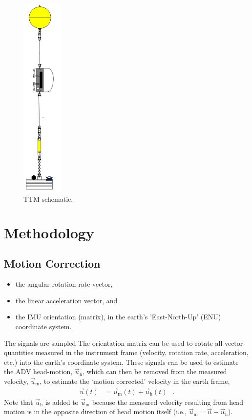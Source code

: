 \documentclass[twocol]{ametsoc}
\def\earth{}
\def\ue{\ensuremath{\vec{u}\earth}}
\def\uacc{\ensuremath{\ue_a}}
\begin{document}
\begin{figure}[t]
  \centering
  \includegraphics[width=0.8in]{ttm06}
  \caption{TTM schematic.}
  \label{fig:ttm_schematic}
\end{figure}

\section{Methodology}

\subsection{Motion Correction}\label{sec:proc:motion}

\def\AngRt{\ensuremath{\vec{\omega}}}
\def\Accel{\ensuremath{{\vec{a}^*}}}
\def\Accelp{\ensuremath{{\vec{a}^{*'}}}}
\def\ue{\ensuremath{\vec{u}\earth}}
\def\um{\ensuremath{\ue_\mathrm{h}}}
\def\uadv{\ensuremath{\ue_\mathrm{m}}}
\def\urot{\ensuremath{\ue_\omega}}
\def\uacc{\ensuremath{\ue_a}}

\begin{itemize}
\item the angular rotation rate vector,
\item the linear acceleration vector, and
\item the IMU orientation (matrix), in the earth's 'East-North-Up' (ENU) coordinate system.
\end{itemize}
The signals are sampled 
The orientation matrix can be used to rotate all vector-quantities measured in the instrument frame (velocity, rotation rate, acceleration, etc.) into the earth's coordinate system. 
These signals can be used to estimate the ADV head-motion, $\um$, which can then be removed from the measured velocity, $\uadv$, to estimate the `motion corrected' velocity in the earth frame,
\begin{align}
  \label{eqn:u_mot_def}
  \ue(t) & = \uadv(t) + \um(t) &  .
\end{align}
Note that $\um$ is added to $\uadv$ because the measured velocity resulting from head motion is in the opposite direction of head motion itself (i.e., $\uadv = \ue - \um$).
\end{document}
